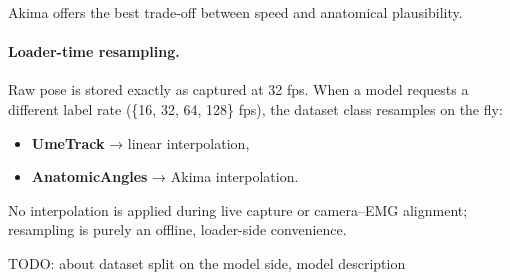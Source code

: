 Akima offers the best trade-off between speed and anatomical plausibility.

\paragraph{Loader-time resampling.}
Raw pose is stored exactly as captured at 32 fps.  
When a model requests a different label rate (\{16, 32, 64, 128\} fps),
the dataset class resamples on the fly:

\begin{itemize}
  \item \textbf{UmeTrack} → linear interpolation,
  \item \textbf{AnatomicAngles} → Akima interpolation.
\end{itemize}

No interpolation is applied during live capture or camera–EMG alignment;
resampling is purely an offline, loader-side convenience.




TODO: about dataset split on the model side, model description
